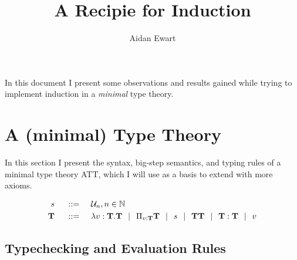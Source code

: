 \documentclass{article}
\author{Aidan Ewart}
\title{A Recipie for Induction}
\newcommand{\set}{\mathcal{U}}
\newcommand{\nat}{\mathbb{N}}
\newcommand{\fun}[2]{\lambda #1. #2}
\newcommand{\for}[2]{\Pi_{#1}#2}
\newcommand{\bnfdef}{\hspace{0.5cm} ::= \hspace{0.5cm}}
\newcommand{\alt}{\hspace{0.25cm} | \hspace{0.25cm}}
\newcommand{\bb}{\mathbf}
\begin{document}
\maketitle

In this document I present some observations and results gained while trying to implement induction in a \emph{minimal} type theory.

\section{A (minimal) Type Theory}
In this section I present the syntax, big-step semantics, and typing rules of a minimal type theory ATT, which I will use as a basis to extend with more axioms. 

\begin{align*}
    s \bnfdef& \set_n, n \in \nat
    \\
    \bb{T} \bnfdef& \fun{v:\bb{T}}{\bb{T}} \alt \for{v : \bb{T}}{\bb{T}} \alt s \alt \bb{T T} \alt \bb{T} : \bb{T} \alt v
\end{align*}

\subsection{Typechecking and Evaluation Rules}
\end{document}
